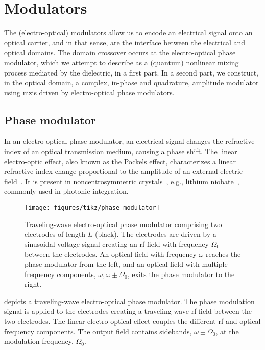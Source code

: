 \section{Modulators}

The (electro-optical) modulators allow us to encode an electrical signal onto an optical carrier, and in that sense, are the interface between the electrical and optical domains.
The domain crossover occurs at the electro-optical phase modulator, which we attempt to describe as a (quantum) nonlinear mixing process mediated by the dielectric, in a first part.
In a second part, we construct, in the optical domain, a complex, in-phase and quadrature, amplitude modulator using \gls{mzi}s driven by electro-optical phase modulators.

\subsection{Phase modulator}

In an electro-optical phase modulator, an electrical signal changes the refractive index of an optical transmission medium, causing a phase shift.
The linear electro-optic effect, also known as the Pockels effect, characterizes a linear refractive index change proportional to the amplitude of an external electric field~\cite[Ch.~18]{Saleh2007}.
It is present in noncentrosymmetric crystals~\cite[p.~2]{Boyd2020}, e.g., lithium niobate~\cite[p.~237]{Yariv1984}, commonly used in photonic integration.
\begin{figure}[htb]
    \centering
    \texttt{[image: figures/tikz/phase-modulator]}
    \caption{Traveling-wave electro-optical phase modulator comprising two electrodes of length $L$ (black). The electrodes are driven by a sinusoidal voltage signal creating an \gls{rf} field with frequency $\Omega_0$ between the electrodes. An optical field with frequency $\omega$ reaches the phase modulator from the left, and an optical field with multiple frequency components, $\omega,\omega\pm\Omega_0$, exits the phase modulator to the right.}\label{fig:phase_modulator}
\end{figure}
 depicts a traveling-wave electro-optical phase modulator.
The phase modulation signal is applied to the electrodes creating a traveling-wave \gls{rf} field between the two electrodes.
The linear-electro optical effect couples the different \gls{rf} and optical frequency components.
The output field contains sidebands, $\omega\pm\Omega_0$, at the modulation frequency, $\Omega_0$.

